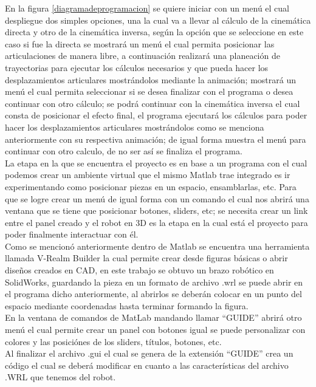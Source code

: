 En la figura \ref{diagramadeprogramacion} se quiere iniciar con un menú el cual despliegue dos simples opciones, una la cual va a llevar al cálculo de la cinemática directa y otro de la cinemática inversa, según la opción que se seleccione en este caso si fue la directa se mostrará un menú el cual permita posicionar las articulaciones de manera libre, a continuación realizará una planeación de trayectorias para ejecutar los cálculos necesarios y que pueda hacer los desplazamientos articulares mostrándolos mediante la animación; mostrará un menú el cual permita seleccionar si se desea finalizar con el programa o desea continuar con otro cálculo; se podrá continuar con la cinemática inversa el cual consta de posicionar el efecto final, el programa ejecutará los cálculos para poder hacer los desplazamientos articulares mostrándolos como se menciona anteriormente con su respectiva animación; de igual forma muestra el menú para continuar con otro calculo, de no ser así se finaliza el programa.\\

La etapa en la que se encuentra el proyecto es en base a un programa con el cual podemos crear un ambiente virtual que el mismo Matlab trae integrado es ir experimentando como posicionar piezas en un espacio, ensamblarlas, etc. 
Para que se logre crear un menú de igual forma con un comando el cual nos abrirá una ventana que se tiene que posicionar botones, sliders, etc; se necesita crear un link entre el panel creado y el robot en 3D es la etapa en la cual está el proyecto para poder finalmente interactuar con él.\\
Como se mencionó anteriormente dentro de Matlab se encuentra una herramienta llamada V-Realm Builder la cual permite crear desde figuras básicas o abrir diseños creados en CAD, en este trabajo se obtuvo un brazo robótico en SolidWorks, guardando la pieza en un formato de archivo .wrl se puede abrir en el programa dicho anteriormente, al abrirlos se deberán colocar en un punto del espacio mediante coordenadas hasta terminar formando la figura.\\
En la ventana de comandos de MatLab mandando llamar ``GUIDE'' abrirá otro menú el cual permite crear un panel con botones igual se puede personalizar con colores y las posiciónes de los sliders, títulos, botones, etc.\\
Al finalizar el archivo .gui el cual se genera de la extensión ``GUIDE'' crea un código el cual se deberá modificar en cuanto a las características del archivo .WRL que tenemos del robot.